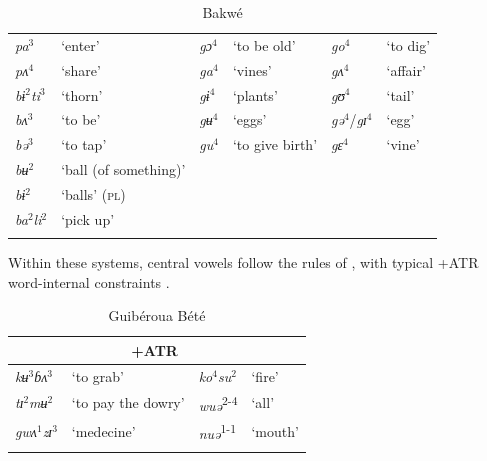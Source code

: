 \documentclass[output=paper,newtxmath,modfonts,nonflat,draft]{langsci/langscibook}
\begin{document}
\begin{table}
\caption{Bakwé \citep{centredetraduction2006}}
\label{tab:zogbo:7}
\begin{tabularx}{\textwidth}{XlXlXl}
\lsptoprule
\textit{pa}$^3$ &   ‘enter’  &  \textit{gɔ}$^4$    & ‘to be old’ &  \textit{go}$^4$ &    ‘to dig’\\

\textit{pʌ}$^4$  &   ‘share’    & \textit{ga}$^4$ &   ‘vines’     & \textit{gʌ}$^4$ &    ‘affair’\\

\textit{bɨ}$^2$\textit{ti}$^3$ & ‘thorn’ &    \textit{gɨ}$^4$ &   ‘plants’  & \textit{gʊ}$^4$ &    ‘tail’\\

\textit{bʌ}$^3$ & ‘to be’ &    \textit{gʉ}$^4$ &   ‘eggs’  &   \textit{gə}$^4$/\textit{gɪ}$^4$ & ‘egg’\\

\textit{bə}$^3$ & ‘to tap’ &    \textit{gu}$^4$   & ‘to give birth’ &  \textit{gɛ}$^4$  &   ‘vine’\\

\textit{bʉ}$^2$ & ‘ball (of something)’\\

\textit{bɨ}$^2$ & ‘balls’ (\textsc{pl})\\

\textit{ba}$^2$\textit{li}$^2$ & ‘pick up’\\
\lspbottomrule
\end{tabularx}
\end{table}

Within these systems, central vowels follow the rules of , with typical +ATR word-internal constraints .

 

\begin{table}
\caption{Guibéroua Bété \citep{Werle1976}}
\label{tab:zogbo:8}
\begin{tabular}{llll}
\lsptoprule
\multicolumn{2}{c}{−ATR} & \multicolumn{2}{c}{+ATR}\\
\midrule
\textit{kʉ}$^3$\textit{ɓʌ}$^3$ &  ‘to grab’ &      \textit{ko}$^4$\textit{su}$^2$ &   ‘fire’\\

\textit{tɪ}$^2$\textit{mʉ}$^2$ & ‘to pay the dowry’  &  \textit{wuə}\textsuperscript{2-4} & ‘all’\\

\textit{gwʌ}$^1$\textit{zɪ}$^3$ &  ‘medecine’      & \textit{nuə}\textsuperscript{1-1}  &   ‘mouth’\\
\lspbottomrule
\end{tabular}
\end{table}
\end{document}
